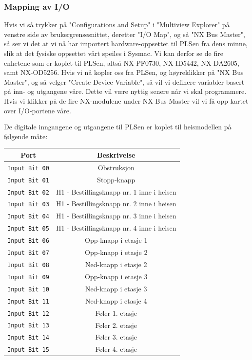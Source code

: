 \begin{alphasection}
\subsubsection{Mapping av I/O}
Hvis vi så trykker på "Configurations and Setup" i "Multiview Explorer" på venstre side av brukergrensesnittet, deretter "I/O Map", og så "NX Bus Master", så ser vi det at vi nå har importert hardware-oppsettet til PLSen fra dens minne, slik at det fysiske oppsettet vårt speiles i Sysmac. Vi kan derfor se de fire enhetene som er koplet til PLSen, altså NX-PF0730, NX-ID5442, NX-DA2605, samt NX-OD5256. Hvis vi nå kopler oss fra PLSen, og høyreklikker på "NX Bus Master", og så velger "Create Device Variable", så vil vi definere variabler basert på inn- og utgangene våre. Dette vil være nyttig senere når vi skal programmere. Hvis vi klikker på de fire NX-modulene under NX Bus Master vil vi få opp kartet over I/O-portene våre.

De digitale inngangene og utgangene til PLSen er koplet til heismodellen på følgende måte:

\begin{center}
 {\begin{tabular}{|c| c|} 
 \hline
 \textbf{Port} & \textbf{Beskrivelse} \\ 
 \toprule
 \verb|Input Bit 00| & Obstruksjon \\ 
 \hline
 \verb|Input Bit 01| & Stopp-knapp \\ 
 \hline
 \verb|Input Bit 02| & H1 - Bestillingsknapp nr. 1 inne i heisen \\ 
 \hline
 \verb|Input Bit 03| & H1 - Bestillingsknapp nr. 2 inne i heisen \\ 
 \hline
 \verb|Input Bit 04| & H1 - Bestillingsknapp nr. 3 inne i heisen \\ 
 \hline
 \verb|Input Bit 05| & H1 - Bestillingsknapp nr. 4 inne i heisen \\ 
 \hline
 \verb|Input Bit 06| & Opp-knapp i etasje 1 \\ 
 \hline
 \verb|Input Bit 07| & Opp-knapp i etasje 2 \\ 
 \toprule
 
 \verb|Input Bit 08| & Ned-knapp i etasje 2 \\ 
 \hline
 \verb|Input Bit 09| & Opp-knapp i etasje 3 \\ 
 \hline
 \verb|Input Bit 10| & Ned-knapp i etasje 3\\ 
 \hline
 \verb|Input Bit 11| & Ned-knapp i etasje 4 \\ 
 \hline
 \verb|Input Bit 12| & Føler 1. etasje \\ 
 \hline
 \verb|Input Bit 13| & Føler 2. etasje \\ 
 \hline
 \verb|Input Bit 14| & Føler 3. etasje \\ 
 \hline
 \verb|Input Bit 15| & Føler 4. etasje \\ 
 \toprule
 

\end{tabular}}
\end{center}
\end{alphasection}

